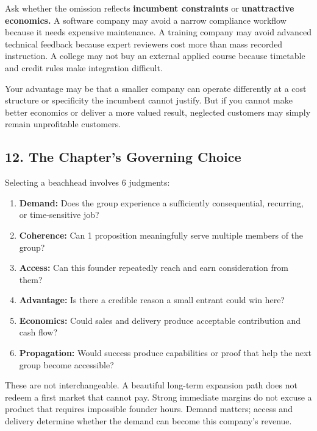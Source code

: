Ask whether the omission reflects \textbf{incumbent constraints} or \textbf{unattractive economics.} A software company may avoid a narrow compliance workflow because it needs expensive maintenance. A training company may avoid advanced technical feedback because expert reviewers cost more than mass recorded instruction. A college may not buy an external applied course because timetable and credit rules make integration difficult.

Your advantage may be that a smaller company can operate differently at a cost structure or specificity the incumbent cannot justify. But if you cannot make better economics or deliver a more valued result, neglected customers may simply remain unprofitable customers.

\subsection*{12. The Chapter's Governing Choice}

Selecting a beachhead involves 6 judgments:

\begin{enumerate}
    \item \textbf{Demand:} Does the group experience a sufficiently consequential, recurring, or time-sensitive job?
    \item \textbf{Coherence:} Can 1 proposition meaningfully serve multiple members of the group?
    \item \textbf{Access:} Can this founder repeatedly reach and earn consideration from them?
    \item \textbf{Advantage:} Is there a credible reason a small entrant could win here?
    \item \textbf{Economics:} Could sales and delivery produce acceptable contribution and cash flow?
    \item \textbf{Propagation:} Would success produce capabilities or proof that help the next group become accessible?
\end{enumerate}

These are not interchangeable. A beautiful long-term expansion path does not redeem a first market that cannot pay. Strong immediate margins do not excuse a product that requires impossible founder hours. Demand matters; access and delivery determine whether the demand can become this company's revenue.
